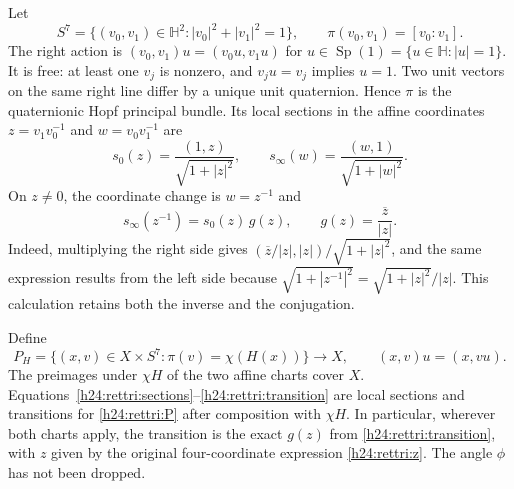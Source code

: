 Let
\[
 S^7=\{(v_0,v_1)\in\mathbb H^2:|v_0|^2+|v_1|^2=1\},\qquad
 \pi(v_0,v_1)=[v_0:v_1].
\]
The right action is $(v_0,v_1)u=(v_0u,v_1u)$ for
$u\in\operatorname{Sp}(1)=\{u\in\mathbb H:|u|=1\}$. It is free:
at least one $v_j$ is nonzero, and $v_ju=v_j$ implies $u=1$.
Two unit vectors on the same right line differ by a unique unit
quaternion. Hence $\pi$ is the quaternionic Hopf principal bundle.
Its local sections in the affine coordinates $z=v_1v_0^{-1}$ and
$w=v_0v_1^{-1}$ are
\begin{equation}
 s_0(z)=\frac{(1,z)}{\sqrt{1+|z|^2}},\qquad
 s_\infty(w)=\frac{(w,1)}{\sqrt{1+|w|^2}}.
 \label{h24:rettri:sections}
\end{equation}
On $z\ne0$, the coordinate change is $w=z^{-1}$ and
\begin{equation}
 s_\infty(z^{-1})=s_0(z)\,g(z),\qquad
 g(z)=\frac{\overline z}{|z|}.
 \label{h24:rettri:transition}
\end{equation}
Indeed, multiplying the right side gives
$(\overline z/|z|,|z|)/\sqrt{1+|z|^2}$, and the same expression
results from the left side because
$\sqrt{1+|z^{-1}|^2}=\sqrt{1+|z|^2}/|z|$.
This calculation retains both the inverse and the conjugation.

Define
\begin{equation}
 P_H=\{(x,v)\in X\times S^7:\pi(v)=\chi(H(x))\}
       \longrightarrow X,
 \qquad (x,v)u=(x,vu).
 \label{h24:rettri:P}
\end{equation}
The preimages under $\chi H$ of the two affine charts cover $X$.
Equations~\eqref{h24:rettri:sections}--\eqref{h24:rettri:transition}
are local sections and transitions for \eqref{h24:rettri:P} after
composition with $\chi H$. In particular, wherever both charts apply,
the transition is the exact $g(z)$ from \eqref{h24:rettri:transition},
with $z$ given by the original four-coordinate expression
\eqref{h24:rettri:z}. The angle $\phi$ has not been dropped.


